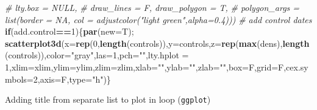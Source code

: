\documentclass[10,portrait]{article}
\newenvironment{Shaded}{\begin{snugshade}}{\end{snugshade}}
\newcommand{\KeywordTok}[1]{\textcolor[rgb]{0.13,0.29,0.53}{\textbf{#1}}}
\newcommand{\DataTypeTok}[1]{\textcolor[rgb]{0.13,0.29,0.53}{#1}}
\newcommand{\DecValTok}[1]{\textcolor[rgb]{0.00,0.00,0.81}{#1}}
\newcommand{\StringTok}[1]{\textcolor[rgb]{0.31,0.60,0.02}{#1}}
\newcommand{\CommentTok}[1]{\textcolor[rgb]{0.56,0.35,0.01}{\textit{#1}}}
\newcommand{\ControlFlowTok}[1]{\textcolor[rgb]{0.13,0.29,0.53}{\textbf{#1}}}
\newcommand{\OperatorTok}[1]{\textcolor[rgb]{0.81,0.36,0.00}{\textbf{#1}}}
\newcommand{\NormalTok}[1]{#1}
\begin{document}
\begin{Shaded}
\begin{Highlighting}[]
\CommentTok{#          lty.box = NULL,}
\CommentTok{#          draw_lines = F, draw_polygon = T,}
\CommentTok{#          polygon_args = list(border = NA, col = adjustcolor("light green",alpha=0.4)))}
\CommentTok{# add control dates}
\ControlFlowTok{if}\NormalTok{(add.control}\OperatorTok{==}\DecValTok{1}\NormalTok{)\{}\KeywordTok{par}\NormalTok{(}\DataTypeTok{new=}\NormalTok{T); }\KeywordTok{scatterplot3d}\NormalTok{(}\DataTypeTok{x=}\KeywordTok{rep}\NormalTok{(}\DecValTok{0}\NormalTok{,}\KeywordTok{length}\NormalTok{(controls)),}\DataTypeTok{y=}\NormalTok{controls,}\DataTypeTok{z=}\KeywordTok{rep}\NormalTok{(}\KeywordTok{max}\NormalTok{(dens),}\KeywordTok{length}\NormalTok{(controls)),}\DataTypeTok{color=}\StringTok{"gray"}\NormalTok{,}\DataTypeTok{las=}\DecValTok{1}\NormalTok{,}\DataTypeTok{pch=}\StringTok{""}\NormalTok{,}\DataTypeTok{lty.hplot =} \DecValTok{1}\NormalTok{,}\DataTypeTok{xlim=}\NormalTok{xlim,}\DataTypeTok{ylim=}\NormalTok{ylim,}\DataTypeTok{zlim=}\NormalTok{zlim,}\DataTypeTok{xlab=}\StringTok{""}\NormalTok{,}\DataTypeTok{ylab=}\StringTok{""}\NormalTok{,}\DataTypeTok{zlab=}\StringTok{""}\NormalTok{,}\DataTypeTok{box=}\NormalTok{F,}\DataTypeTok{grid=}\NormalTok{F,}\DataTypeTok{cex.symbols=}\DecValTok{2}\NormalTok{,}\DataTypeTok{axis=}\NormalTok{F,}\DataTypeTok{type=}\StringTok{"h"}\NormalTok{)\}}
\end{Highlighting}
\end{Shaded}

Adding title from separate list to plot in loop (\texttt{ggplot})
\end{document}
